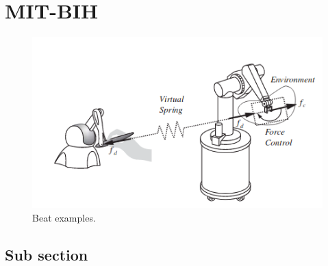 \section{MIT-BIH}

\begin{figure}[htb]
	\begin{center}  
		\includegraphics[scale=0.6]{images/haptic.png}
	\end{center}
	\caption{Beat examples.}
	\label{fig_mitbih}
\end{figure}

\subsection{Sub section}

